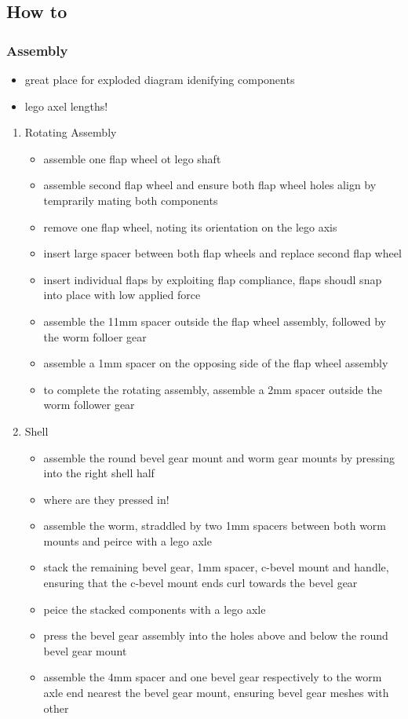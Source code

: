 \documentclass[11pt]{article}
\begin{document}
\subsection{How to}
\label{sec:orga8a0eb3}

\subsubsection{Assembly}
\label{sec:org81558a2}
\begin{itemize}
\item great place for exploded diagram idenifying components
\item lego axel lengths!
\end{itemize}

\begin{enumerate}
\item Rotating Assembly
\label{sec:org02a0fe5}
\begin{itemize}
\item assemble one flap wheel ot lego shaft
\item assemble second flap wheel and ensure both flap wheel holes align by temprarily mating both components
\item remove one flap wheel, noting its orientation on the lego axis
\item insert large spacer between both flap wheels and replace second flap wheel
\item insert individual flaps by exploiting flap compliance, flaps shoudl snap into place with low applied force
\item assemble the 11mm spacer outside the flap wheel assembly, followed by the worm folloer gear
\item assemble a 1mm spacer on the opposing side of the flap wheel assembly
\item to complete the rotating assembly, assemble a 2mm spacer outside the worm follower gear
\end{itemize}

\item Shell
\label{sec:org18a545d}
\begin{itemize}
\item assemble the round bevel gear mount and worm gear mounts by pressing into the right shell half
\item where are they pressed in!
\item assemble the worm, straddled by two 1mm spacers between both worm mounts and peirce with a lego axle
\item stack the remaining bevel gear, 1mm spacer, c-bevel mount and handle, ensuring that the c-bevel mount ends curl towards the bevel gear
\item peice the stacked components with a lego axle
\item press the bevel gear assembly into the holes above and below the round bevel gear mount
\item assemble the 4mm spacer and one bevel gear respectively to the worm axle end nearest the bevel gear mount, ensuring bevel gear meshes with other
\end{itemize}


\end{enumerate}
\end{document}
